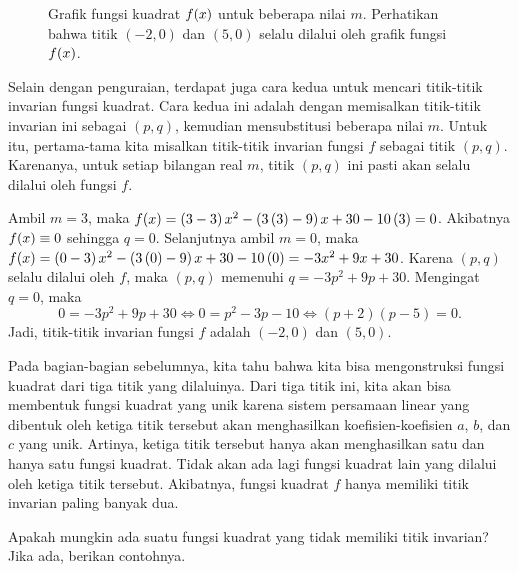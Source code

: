 \begin{jawab}
\begin{figure}[H]
			\caption{Grafik fungsi kuadrat $ \mathop{}\!{f}{\left({x}\right)} $ untuk beberapa nilai $ m $. Perhatikan bahwa titik $ \left(-2, 0\right) $ dan $ \left(5, 0\right) $ selalu dilalui oleh grafik fungsi $ \mathop{}\!{f}{\left({x}\right)} $.}
		\end{figure}
		Selain dengan penguraian, terdapat juga cara kedua untuk mencari titik-titik invarian fungsi kuadrat. Cara kedua ini adalah dengan memisalkan titik-titik invarian ini sebagai $ \left(p, q\right) $, kemudian mensubstitusi beberapa nilai $ m $. Untuk itu, pertama-tama kita misalkan titik-titik invarian fungsi $ f $ sebagai titik $ \left(p, q\right) $. Karenanya, untuk setiap bilangan real $ m $, titik $ \left(p, q\right) $ ini pasti akan selalu dilalui oleh fungsi $ f $.
		\par Ambil $ m = 3 $, maka $ \mathop{}\!{f}{\left({x}\right)} = \left(3 - 3\right)x^{2} - \left(3\left(3\right) - 9\right)x + 30 - 10\left(3\right) = 0 $. Akibatnya $ \mathop{}\!{f}{\left({x}\right)} \equiv 0 $ sehingga $ q = 0 $. Selanjutnya ambil $ m = 0 $, maka $ \mathop{}\!{f}{\left({x}\right)} = \left(0 - 3\right)x^{2} - \left(3\left(0\right) - 9\right)x + 30 - 10\left(0\right) = -3x^{2} + 9x + 30 $. Karena $ \left(p, q\right) $ selalu dilalui oleh $ f $, maka $ \left(p, q\right) $ memenuhi $ q = -3p^{2} + 9p + 30 $. Mengingat $ q = 0 $, maka
		\[ 0 = -3p^{2} + 9p + 30 \iff 0 = p^{2} - 3p - 10 \iff \left(p + 2\right)\left(p - 5\right) = 0. \]
		Jadi, titik-titik invarian fungsi $ f $ adalah $ \left(-2, 0\right) $ dan $ \left(5, 0\right) $.
	\end{jawab}
	
	\par Pada bagian-bagian sebelumnya, kita tahu bahwa kita bisa mengonstruksi fungsi kuadrat dari tiga titik yang dilaluinya. Dari tiga titik ini, kita akan bisa membentuk fungsi kuadrat yang unik karena sistem persamaan linear yang dibentuk oleh ketiga titik tersebut akan menghasilkan koefisien-koefisien $ a $, $ b $, dan $ c $ yang unik. Artinya, ketiga titik tersebut hanya akan menghasilkan satu dan hanya satu fungsi kuadrat. Tidak akan ada lagi fungsi kuadrat lain yang dilalui oleh ketiga titik tersebut. Akibatnya, fungsi kuadrat $ f $ hanya memiliki titik invarian paling banyak dua.
	
	\begin{explbox}
		Apakah mungkin ada suatu fungsi kuadrat yang tidak memiliki titik invarian? Jika ada, berikan contohnya.
	\end{explbox}
	
